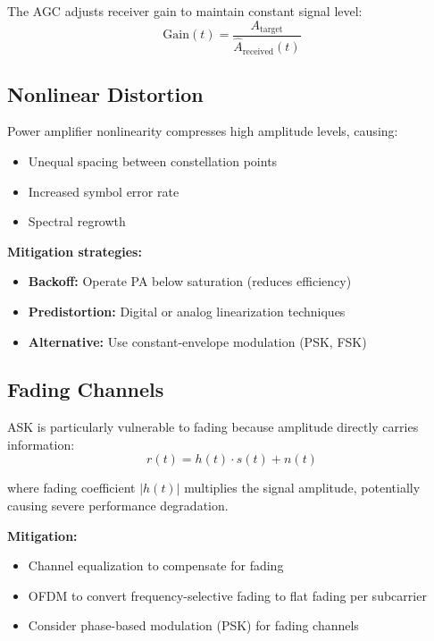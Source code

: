 The AGC adjusts receiver gain to maintain constant signal level:
\begin{equation}
\text{Gain}(t) = \frac{A_{\text{target}}}{\hat{A}_{\text{received}}(t)}
\end{equation}

\subsection{Nonlinear Distortion}

Power amplifier nonlinearity compresses high amplitude levels, causing:
\begin{itemize}
\item Unequal spacing between constellation points
\item Increased symbol error rate
\item Spectral regrowth
\end{itemize}

\textbf{Mitigation strategies:}
\begin{itemize}
\item \textbf{Backoff:} Operate PA below saturation (reduces efficiency)
\item \textbf{Predistortion:} Digital or analog linearization techniques
\item \textbf{Alternative:} Use constant-envelope modulation (PSK, FSK)
\end{itemize}

\subsection{Fading Channels}

ASK is particularly vulnerable to fading because amplitude directly carries information:
\begin{equation}
r(t) = h(t) \cdot s(t) + n(t)
\end{equation}

where fading coefficient $|h(t)|$ multiplies the signal amplitude, potentially causing severe performance degradation.

\textbf{Mitigation:}
\begin{itemize}
\item Channel equalization to compensate for fading
\item OFDM to convert frequency-selective fading to flat fading per subcarrier
\item Consider phase-based modulation (PSK) for fading channels
\end{itemize}

